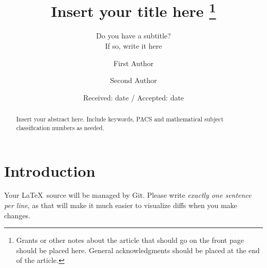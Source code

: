 \documentclass[smallextended]{svjour3}       %
\begin{document}
\title{%
  Insert your title here%
  \thanks{%
    Grants or other notes about the article that should go on the front page should be placed here. General acknowledgments should be placed at the end of the article.
  }
}
\subtitle{%
  Do you have a subtitle?\\ If so, write it here
}


\author{First Author         \and
        Second Author %
}



\date{Received: date / Accepted: date}

\linenumbers
\pagestyle{myheadings}

\maketitle
\thispagestyle{mytitlepage}

\begin{abstract}
  Insert your abstract here. Include keywords, PACS and mathematical subject classification numbers as needed.
\end{abstract}

%

\section{Introduction}%
\label{intro}

Your \LaTeX\ source will be managed by Git.
Please write \emph{exactly one sentence per line}, as that will make it much easier to visualize diffs when you make changes.
\end{document}
